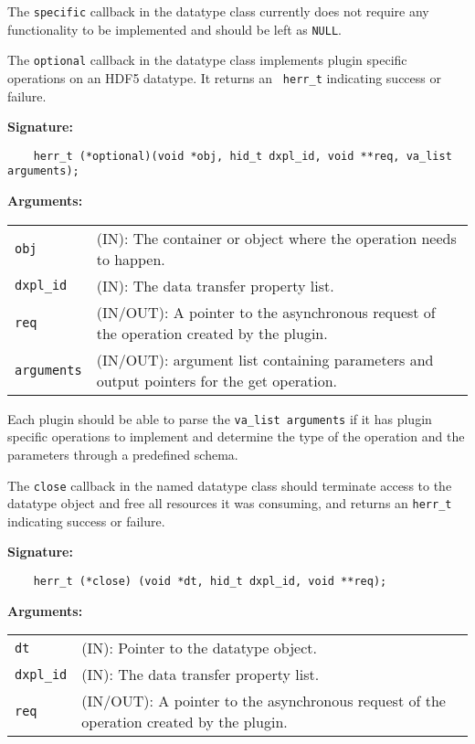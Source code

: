 The {\tt specific} callback in the datatype class currently does not require any functionality to be implemented and should be left as {\tt NULL}.

The {\tt optional} callback in the datatype class implements plugin specific operations on an HDF5 datatype. It returns an {\tt
  herr\_t} indicating success or failure. 

\textbf{Signature:}
\begin{lstlisting}
    herr_t (*optional)(void *obj, hid_t dxpl_id, void **req, va_list arguments);
\end{lstlisting}

\textbf{Arguments:}\\
\begin{tabular}{l p{10cm}}
  {\tt obj} & (IN): The container or object where the operation needs to happen.\\
  {\tt dxpl\_id} & (IN): The data transfer property list.\\
  {\tt req} & (IN/OUT): A pointer to the asynchronous request of the operation created by the plugin.\\
  {\tt arguments} & (IN/OUT): argument list containing parameters and output pointers for the get operation. \\
\end{tabular}

Each plugin should be able to parse the {\tt va\_list arguments} if it has plugin specific operations to implement and determine the type of the operation and the parameters through a predefined schema. 

The {\tt close} callback in the named datatype class should terminate
access to the datatype object and free all resources it was
consuming, and returns an {\tt herr\_t} indicating success or failure.

\textbf{Signature:}
\begin{lstlisting}
    herr_t (*close) (void *dt, hid_t dxpl_id, void **req);
\end{lstlisting}

\textbf{Arguments:}\\
\begin{tabular}{l p{10cm}}
  {\tt dt} & (IN): Pointer to the datatype object.\\
  {\tt dxpl\_id} & (IN): The data transfer property list.\\
  {\tt req} & (IN/OUT): A pointer to the asynchronous request of the
  operation created by the plugin.\\
\end{tabular}

